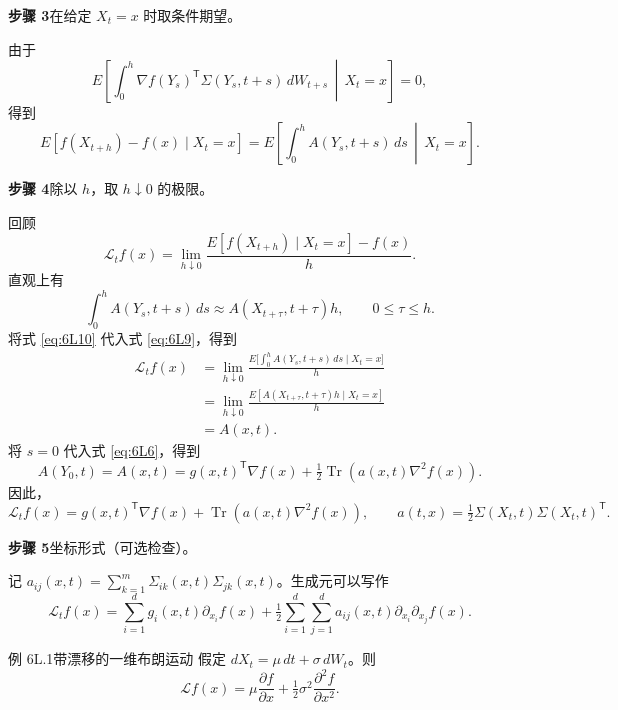 \textbf{步骤 3}\quad 在给定 $X_t=x$ 时取条件期望。

由于
\[
  E\left[\int_0^h\nabla f(Y_s)^{\mathsf T}\Sigma(Y_s,t+s)\,dW_{t+s}\,\middle|\,X_t=x\right]=0,
\]
得到
\begin{equation*}
  E[f(X_{t+h})-f(x)\mid X_t=x]
     =E\left[\int_0^h A(Y_s,t+s)\,ds\,\middle|\,X_t=x\right].
  \tag{6L8}\label{eq:6L8}
\end{equation*}

\textbf{步骤 4}\quad 除以 $h$，取 $h\downarrow0$ 的极限。

回顾
\begin{equation*}
  \mathcal L_t f(x)=\lim_{h\downarrow0}
        \frac{E[f(X_{t+h})\mid X_t=x]-f(x)}{h}.
  \tag{6L9}\label{eq:6L9}
\end{equation*}
直观上有
\begin{equation*}
  \int_0^h A(Y_s,t+s)\,ds\approx A(X_{t+\tau},t+\tau)h,\qquad 0\leq\tau\leq h.
  \tag{6L10}\label{eq:6L10}
\end{equation*}
将式 \eqref{eq:6L10} 代入式 \eqref{eq:6L9}，得到
\begin{equation*}
  \begin{aligned}
    \mathcal L_t f(x)&=\lim_{h\downarrow0}
       \frac{E\bigl[\int_0^h A(Y_s,t+s)\,ds\mid X_t=x\bigr]}{h}\\
     &=\lim_{h\downarrow0}\frac{E[A(X_{t+\tau},t+\tau)h\mid X_t=x]}{h}\\
     &=A(x,t).
  \end{aligned}
  \tag{6L11}\label{eq:6L11}
\end{equation*}
将 $s=0$ 代入式 \eqref{eq:6L6}，得到
\[
  A(Y_0,t)=A(x,t)=g(x,t)^{\mathsf T}\nabla f(x)
              +\tfrac12\operatorname{Tr}(a(x,t)\nabla^2 f(x)).
\]
因此，
\[
  \mathcal L_t f(x)=g(x,t)^{\mathsf T}\nabla f(x)+\operatorname{Tr}(a(x,t)\nabla^2 f(x)),
  \qquad a(t,x)=\tfrac12\Sigma(X_t,t)\Sigma(X_t,t)^{\mathsf T}.
\]

\textbf{步骤 5}\quad 坐标形式（可选检查）。

记 $a_{ij}(x,t)=\sum_{k=1}^{m}\Sigma_{ik}(x,t)\Sigma_{jk}(x,t)$。生成元可以写作
\begin{equation*}
  \mathcal L_t f(x)=\sum_{i=1}^d g_i(x,t)\partial_{x_i} f(x)
       +\tfrac12\sum_{i=1}^d\sum_{j=1}^d a_{ij}(x,t)\partial_{x_i}\partial_{x_j}f(x).
  \tag{L162}\label{eq:L162}
\end{equation*}


\begin{statement}{例 6L.1}{带漂移的一维布朗运动}
假定 $dX_t=\mu\,dt+\sigma\,dW_t$。则
\[
  \mathcal Lf(x)=\mu\frac{\partial f}{\partial x}
                   +\tfrac12\sigma^2\frac{\partial^2 f}{\partial x^2}.
\]
\end{statement}

